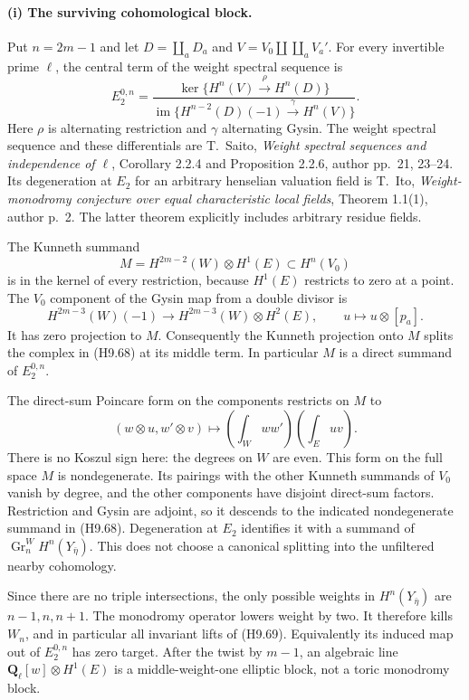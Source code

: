 \paragraph{(i) The surviving cohomological block.}
Put $n=2m-1$ and let $D=\coprod_aD_a$ and
$V=V_0\amalg\coprod_aV_a'$. For every invertible prime $\ell$,
the central term of the weight spectral sequence is
\[
 E_2^{0,n}
   =\frac{\ker\{H^n(V)\xrightarrow{\rho}H^n(D)\}}
          {\operatorname{im}\{H^{n-2}(D)(-1)
                                \xrightarrow{\gamma}H^n(V)\}}.
                                                               \tag{H9.68}
\]
Here $\rho$ is alternating restriction and $\gamma$ alternating
Gysin. The weight spectral sequence and these differentials are
T.~Saito, \emph{Weight spectral sequences and independence of
$\ell$}, Corollary 2.2.4 and Proposition 2.2.6, author pp.~21,
23--24. Its degeneration at $E_2$ for an arbitrary henselian
valuation field is T.~Ito, \emph{Weight-monodromy conjecture over
equal characteristic local fields}, Theorem 1.1(1), author p.~2.
The latter theorem explicitly includes arbitrary residue fields.

The Kunneth summand
\[
 M=H^{2m-2}(W)\otimes H^1(E)
       \subset H^n(V_0)                                    \tag{H9.69}
\]
is in the kernel of every restriction, because $H^1(E)$ restricts
to zero at a point. The $V_0$ component of the Gysin map from a
double divisor is
\[
 H^{2m-3}(W)(-1)\longrightarrow H^{2m-3}(W)\otimes H^2(E),
       \qquad u\longmapsto u\otimes[p_a].
\]
It has zero projection to $M$. Consequently the Kunneth projection
onto $M$ splits the complex in (H9.68) at its middle term. In
particular $M$ is a direct summand of $E_2^{0,n}$.

The direct-sum Poincare form on the components restricts on $M$ to
\[
 (w\otimes u,w'\otimes v)
       \longmapsto \left(\int_Www'\right)\left(\int_Euv\right).
                                                               \tag{H9.70}
\]
There is no Koszul sign here: the degrees on $W$ are even. This
form on the full space $M$ is nondegenerate. Its pairings with the
other Kunneth summands of $V_0$ vanish by degree, and the other
components have disjoint direct-sum factors. Restriction and Gysin
are adjoint, so it descends to the indicated nondegenerate summand
in (H9.68). Degeneration at $E_2$ identifies it with a summand of
$\operatorname{Gr}^W_nH^n(Y_{\bar\eta})$. This does not choose a
canonical splitting into the unfiltered nearby cohomology.

Since there are no triple intersections, the only possible weights
in $H^n(Y_{\bar\eta})$ are $n-1,n,n+1$. The monodromy operator
lowers weight by two. It therefore kills $W_n$, and in particular
all invariant lifts of (H9.69). Equivalently its induced map out of
$E_2^{0,n}$ has zero target. After the twist by $m-1$, an algebraic
line $\mathbf Q_\ell[w]\otimes H^1(E)$ is a middle-weight-one
elliptic block, not a toric monodromy block.

